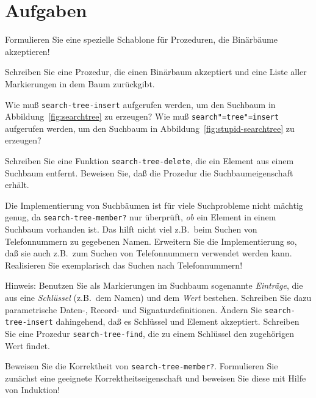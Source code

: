 \section*{Aufgaben}

\begin{aufgabe}
  \label{ex:recipe-trees}
  Formulieren Sie eine spezielle Schablone für Prozeduren, die
  Binärbäume akzeptieren!
\end{aufgabe}

\begin{aufgabe}
  Schreiben Sie eine Prozedur, die einen Binärbaum akzeptiert
  und eine Liste aller Markierungen in dem Baum zurückgibt.
\end{aufgabe}

\begin{aufgabe}
  Wie muß \texttt{search-tree-insert} aufgerufen werden, um den
  Suchbaum in Abbildung~\ref{fig:searchtree} zu erzeugen?  Wie muß
  \texttt{search"=tree"=insert} aufgerufen werden, um den Suchbaum in
  Abbildung~\ref{fig:stupid-searchtree} zu erzeugen?
\end{aufgabe}

\begin{aufgabe}
  Schreiben Sie eine Funktion \texttt{search-tree-delete}, die ein
  Element aus einem Suchbaum entfernt.  Beweisen Sie, daß die Prozedur die
  Suchbaumeigenschaft erhält.
\end{aufgabe}

\begin{aufgabe}
  Die Implementierung von Suchbäumen ist für viele Suchprobleme nicht
  mächtig genug, da \texttt{search-tree-member?} nur überprüft,
  \emph{ob} ein Element in einem Suchbaum vorhanden ist.  Das hilft
  nicht viel z.B.\ beim Suchen von Telefonnummern zu gegebenen Namen.
  Erweitern Sie die Implementierung so, daß sie auch z.B.\ zum Suchen
  von Telefonnummern verwendet werden kann.  Realisieren Sie
  exemplarisch das Suchen nach Telefonnummern!

  Hinweis: Benutzen Sie als Markierungen im Suchbaum sogenannte
  \textit{Einträge}, die aus eine \textit{Schlüssel} (z.B.\ dem Namen)
  und dem \textit{Wert} bestehen.  Schreiben Sie dazu parametrische Daten-,
  Record- und Signaturdefinitionen. Ändern Sie \texttt{search-tree-insert}
  dahingehend, daß es Schlüssel und Element akzeptiert.  Schreiben Sie eine
  Prozedur \texttt{search-tree-find}, die zu einem Schlüssel den
  zugehörigen Wert findet.
\end{aufgabe}

\begin{aufgabe}
  Beweisen Sie die Korrektheit von \texttt{search-tree-member?}.
  Formulieren Sie zunächst eine geeignete Korrektheitseigenschaft und
  beweisen Sie diese mit Hilfe von Induktion!
\end{aufgabe}

